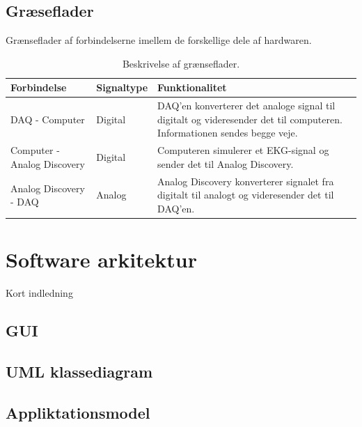 \subsection{Græseflader}
Grænseflader af forbindelserne imellem de forskellige dele af hardwaren. 

\begin{table}[H] 
	\begin{tabularx}{\textwidth}{l l X}
    \toprule
     \textbf{Forbindelse}   & \textbf{Signaltype} & \textbf{Funktionalitet}    \\ \midrule
     DAQ - Computer         & Digital & DAQ'en konverterer det analoge signal til digitalt og videresender det til 							  computeren. Informationen sendes begge veje. \\ 
     					      \addlinespace[2mm]                                                                                                                                                                            
     Computer - Analog Discovery			& Digital & Computeren simulerer et EKG-signal og sender det til Analog Discovery.\\ 
     				    	  \addlinespace[2mm]   				                                                                                                                                                                           
     Analog Discovery - DAQ			   	& Analog & Analog Discovery	 konverterer signalet fra digitalt til analogt og videresender det til 							      DAQ'en.\\  				      
    \bottomrule                                                                                                                   
    \end{tabularx}
    \caption {Beskrivelse af grænseflader.}
    \label{tab:graenseflader}
\end{table}



\section{Software arkitektur}
Kort indledning

\subsection{GUI}

\subsection{UML klassediagram}

\subsection{Appliktationsmodel}
